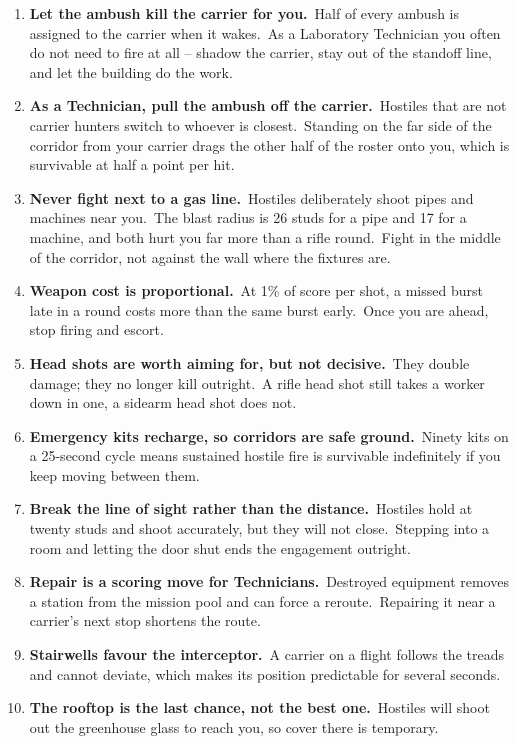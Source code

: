 \begin{enumerate}
\item \textbf{Let the ambush kill the carrier for you.}\ Half of every ambush is
      assigned to the carrier when it wakes.\ As a Laboratory Technician you
      often do not need to fire at all -- shadow the carrier, stay out of the
      standoff line, and let the building do the work.\
\item \textbf{As a Technician, pull the ambush off the carrier.}\ Hostiles that
      are not carrier hunters switch to whoever is closest.\ Standing on the far
      side of the corridor from your carrier drags the other half of the roster
      onto you, which is survivable at half a point per hit.\
\item \textbf{Never fight next to a gas line.}\ Hostiles deliberately shoot
      pipes and machines near you.\ The blast radius is 26 studs for a pipe and
      17 for a machine, and both hurt you far more than a rifle round.\ Fight in
      the middle of the corridor, not against the wall where the fixtures are.\
\item \textbf{Weapon cost is proportional.}\ At 1\% of score per shot, a missed
      burst late in a round costs more than the same burst early.\ Once you are
      ahead, stop firing and escort.\
\item \textbf{Head shots are worth aiming for, but not decisive.}\ They double
      damage; they no longer kill outright.\ A rifle head shot still takes a
      worker down in one, a sidearm head shot does not.\
\item \textbf{Emergency kits recharge, so corridors are safe ground.}\ Ninety
      kits on a 25-second cycle means sustained hostile fire is survivable
      indefinitely if you keep moving between them.\
\item \textbf{Break the line of sight rather than the distance.}\ Hostiles hold
      at twenty studs and shoot accurately, but they will not close.\ Stepping
      into a room and letting the door shut ends the engagement outright.\
\item \textbf{Repair is a scoring move for Technicians.}\ Destroyed equipment
      removes a station from the mission pool and can force a reroute.\ Repairing
      it near a carrier's next stop shortens the route.\
\item \textbf{Stairwells favour the interceptor.}\ A carrier on a flight follows
      the treads and cannot deviate, which makes its position predictable for
      several seconds.\
\item \textbf{The rooftop is the last chance, not the best one.}\ Hostiles will
      shoot out the greenhouse glass to reach you, so cover there is temporary.\
\end{enumerate}
